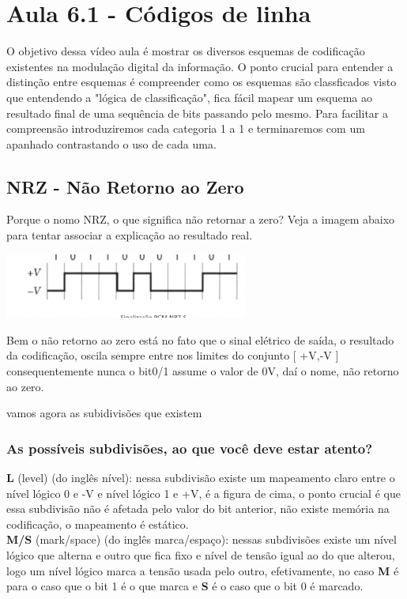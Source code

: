 \section{Aula 6.1 - Códigos de linha}

O objetivo dessa vídeo aula é mostrar os diversos esquemas de codificação existentes na modulação digital da informação.
O ponto crucial para entender a distinção entre esquemas é compreender como os esquemas são classficados visto que entendendo a "lógica de classificação",
fica fácil mapear um esquema ao resultado final de uma sequência de bits passando pelo mesmo. Para facilitar a compreensão introduziremos cada categoria 1 a 1 e terminaremos
com um apanhado contrastando o uso de cada uma.

\subsection{NRZ - Não Retorno ao Zero}

Porque o nomo NRZ, o que significa não retornar a zero? Veja a imagem abaixo para tentar associar a explicação ao resultado real.

\includegraphics[width=0.6\textwidth]{../assets/nrz.png}\cite{dc}

Bem o não retorno ao zero está no fato que o sinal elétrico de saída, o resultado da codificação, oscila sempre entre nos limites do conjunto [ +V,-V ] consequentemente nunca o bit0/1 assume o valor
de 0V, daí o nome, não retorno ao zero.

vamos agora as subidivisões que existem

\subsubsection{As possíveis subdivisões, ao que você deve estar atento?}

\textbf{L} (level) (do inglês nível): nessa subdivisão existe um mapeamento claro entre o nível lógico 0 e -V e nível lógico 1 e +V, é a figura de cima, o ponto crucial é que essa subdivisão
não é afetada pelo valor do bit anterior, não existe memória na codificação, o mapeamento é estático.
\\

\textbf{M/S} (mark/space) (do inglês marca/espaço): nessas subdivisões existe um nível lógico que alterna e outro que fica fixo e nível de tensão igual ao do que alterou, logo um nível lógico
marca a tensão usada pelo outro, efetivamente, no caso \textbf{M} é para o caso que o bit 1 é o que marca e \textbf{S} é o caso que o bit 0 é marcado.

